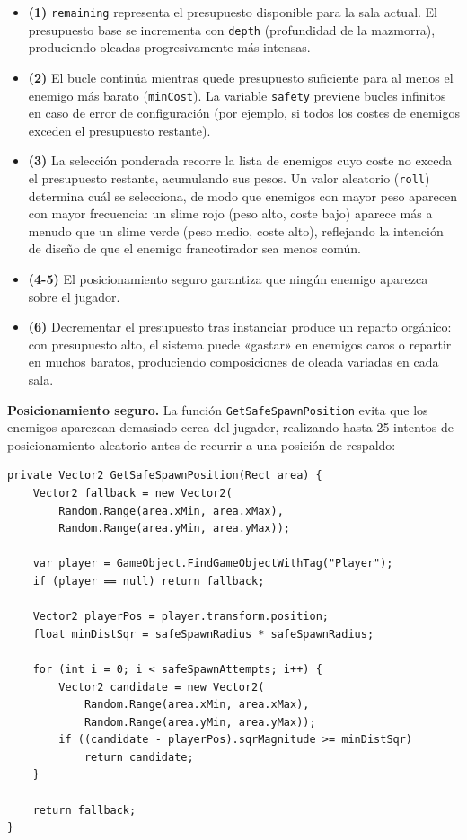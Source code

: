 \begin{itemize}
\item \textbf{(1)} \texttt{remaining} representa el presupuesto disponible para la sala actual. El presupuesto base se incrementa con \texttt{depth} (profundidad de la mazmorra), produciendo oleadas progresivamente más intensas.
\item \textbf{(2)} El bucle continúa mientras quede presupuesto suficiente para al menos el enemigo más barato (\texttt{minCost}). La variable \texttt{safety} previene bucles infinitos en caso de error de configuración (por ejemplo, si todos los costes de enemigos exceden el presupuesto restante).
\item \textbf{(3)} La selección ponderada recorre la lista de enemigos cuyo coste no exceda el presupuesto restante, acumulando sus pesos. Un valor aleatorio (\texttt{roll}) determina cuál se selecciona, de modo que enemigos con mayor peso aparecen con mayor frecuencia: un slime rojo (peso alto, coste bajo) aparece más a menudo que un slime verde (peso medio, coste alto), reflejando la intención de diseño de que el enemigo francotirador sea menos común.
\item \textbf{(4-5)} El posicionamiento seguro garantiza que ningún enemigo aparezca sobre el jugador.
\item \textbf{(6)} Decrementar el presupuesto tras instanciar produce un reparto orgánico: con presupuesto alto, el sistema puede «gastar» en enemigos caros o repartir en muchos baratos, produciendo composiciones de oleada variadas en cada sala.
\end{itemize}

\textbf{Posicionamiento seguro.} La función \texttt{GetSafeSpawnPosition} evita que los enemigos aparezcan demasiado cerca del jugador, realizando hasta 25 intentos de posicionamiento aleatorio antes de recurrir a una posición de respaldo:

\begin{lstlisting}
private Vector2 GetSafeSpawnPosition(Rect area) {
    Vector2 fallback = new Vector2(
        Random.Range(area.xMin, area.xMax),
        Random.Range(area.yMin, area.yMax));
    
    var player = GameObject.FindGameObjectWithTag("Player");
    if (player == null) return fallback;
    
    Vector2 playerPos = player.transform.position;
    float minDistSqr = safeSpawnRadius * safeSpawnRadius;
    
    for (int i = 0; i < safeSpawnAttempts; i++) {
        Vector2 candidate = new Vector2(
            Random.Range(area.xMin, area.xMax),
            Random.Range(area.yMin, area.yMax));
        if ((candidate - playerPos).sqrMagnitude >= minDistSqr)
            return candidate;
    }
    
    return fallback;
}
\end{lstlisting}


